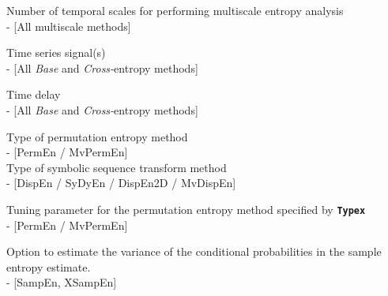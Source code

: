 \documentclass[12pt, a4paper, titlepage, openany]{book}
\begin{document}
\begin{description}[labelsep=1cm, labelwidth=2cm, nosep, style=multiline,leftmargin=3cm]
\item[\texttt{Scales}]		Number of temporal scales for performing multiscale entropy analysis \\  - [All multiscale methods]\\
\item[\texttt{Sig}]		Time series signal(s) \\ - [All \textit{Base} and \textit{Cross-}entropy methods]\\
\item[\texttt{tau}]		Time delay  \\ - [All \textit{Base} and \textit{Cross-}entropy methods]\\
\item[\texttt{Typex}]		Type of permutation entropy method  \\ - [PermEn / MvPermEn]\\
Type of symbolic sequence transform method  \\ - [DispEn / SyDyEn / DispEn2D / MvDispEn]\\
\item[\texttt{tpx}]		Tuning parameter for the permutation entropy method specified by \texttt{\textbf{Typex}} \\ - [PermEn / MvPermEn]\\
\item[\texttt{Vcp}] 	Option to estimate the variance of the conditional probabilities in the sample entropy estimate.\\ - [SampEn, XSampEn]



\end{description}
\end{document}
